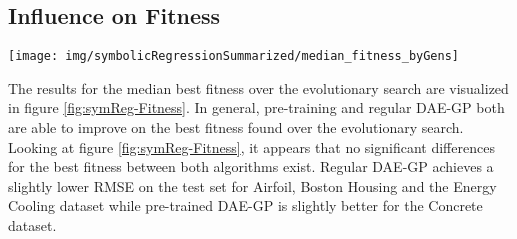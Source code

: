 \documentclass[
  11pt,
]{article}
\let\origfigure\figure
\let\endorigfigure\endfigure
\renewenvironment{figure}[1][2] {
    \expandafter\origfigure\expandafter[H]
} {
    \endorigfigure
}
\begin{document}
\hypertarget{influence-on-fitness}{%
\subsection{Influence on Fitness}\label{influence-on-fitness}}

\begin{figure}[c]

{\centering \texttt{[image: img/symbolicRegressionSummarized/median\_fitness\_byGens]} 

}

\caption{Fitness over 30 Generations - Real World Symbolic Regression}\label{fig:symReg-Fitness}
\end{figure}

The results for the median best fitness over the evolutionary search are visualized in figure \ref{fig:symReg-Fitness}.
In general, pre-training and regular DAE-GP both are able to improve on the best fitness found over the evolutionary search.
Looking at figure \ref{fig:symReg-Fitness}, it appears that no significant differences for the best fitness between both algorithms exist.
Regular DAE-GP achieves a slightly lower RMSE on the test set for Airfoil, Boston Housing and the Energy Cooling dataset while pre-trained DAE-GP is slightly better for the Concrete dataset.
\end{document}
